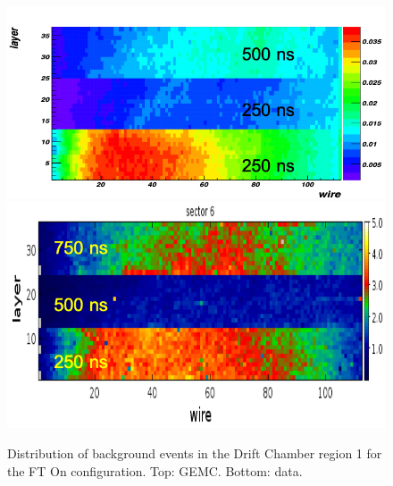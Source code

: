 \begin{figure}
	\centering
	\includegraphics[width=0.95\columnwidth,keepaspectratio]{img/ftOnGemcDCRates.png}
	\includegraphics[width=0.95\columnwidth,keepaspectratio]{img/ftOnDataDCRates.png}
	\caption{Distribution of background events in the Drift Chamber region 1 for the FT On configuration.
             Top: GEMC. Bottom: data.}
	\label{fig:ftOnComparison}
\end{figure}



